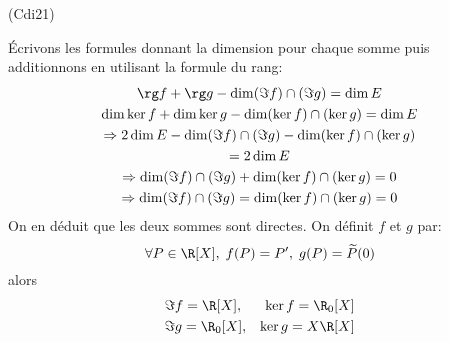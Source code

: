 \begin{tiny}(Cdi21)\end{tiny} \'Ecrivons les formules donnant la dimension pour chaque somme puis additionnons en utilisant la formule du rang:
\begin{multline*}
 \rg f + \rg g -\dim (\Im f)\cap (\Im g) = \dim E \\
 \dim \ker f + \dim \ker g -\dim (\ker f)\cap (\ker g) = \dim E \\
\Rightarrow 2\dim E -\dim(\Im f)\cap (\Im g) -\dim(\ker f)\cap (\ker g) \\
=2\dim E \\
\Rightarrow  \dim(\Im f)\cap (\Im g) +\dim (\ker f)\cap (\ker g) = 0 \\
\Rightarrow \dim (\Im f)\cap (\Im g) = \dim (\ker f)\cap (\ker g) = 0
\end{multline*}
On en déduit que les deux sommes sont directes.\newline
On définit $f$ et $g$ par:
\begin{displaymath}
  \forall P\in \R[X],\; f(P)= P', \; g(P) = \widetilde{P}(0)
\end{displaymath}
alors
\begin{align*}
  &\Im f = \R[X], &\ker f = \R_0[X] \\
  &\Im g = \R_0[X], &\ker g = X\R[X] 
\end{align*}

